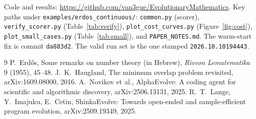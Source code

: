\documentclass[11pt]{article}
\begin{document}
Code and results: \url{https://github.com/van3gue/EvolutionaryMathematics}.
Key paths under \texttt{examples/erdos\_continuous/}: \texttt{common.py}
(scorer), \texttt{verify\_scorer.py} (Table~\ref{tab:verify}),
\texttt{plot\_cost\_curves.py} (Figure~\ref{fig:cost}),
\texttt{plot\_small\_cases.py} (Table~\ref{tab:small}), and
\texttt{PAPER\_NOTES.md}. The warm-start fix is commit \texttt{da883d2}. The
valid run set is the one stamped \texttt{2026.10.10194443}.

\begin{thebibliography}{9}
 P.~Erd\H{o}s, Some remarks on number theory (in Hebrew),
\emph{Riveon Lematematika} 9 (1955), 45--48.
 J.~K.~Haugland, The minimum overlap problem revisited,
arXiv:1609.08000, 2016.
 A.~Novikov et al., AlphaEvolve: A coding agent for
scientific and algorithmic discovery, arXiv:2506.13131, 2025.
 R.~T.~Lange, Y.~Imajuku, E.~Cetin, ShinkaEvolve: Towards
open-ended and sample-efficient program evolution, arXiv:2509.19349, 2025.
\end{thebibliography}
\end{document}
